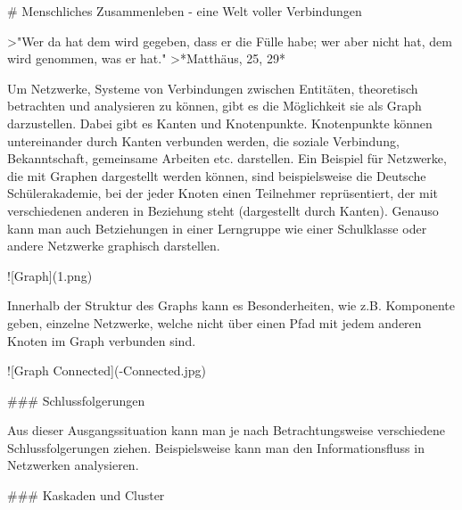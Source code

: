# Menschliches Zusammenleben - eine Welt voller Verbindungen

>"Wer da hat dem wird gegeben, dass er die Fülle habe; wer aber nicht hat, dem wird genommen, was er hat."
>*Matthäus, 25, 29*

Um Netzwerke, Systeme von Verbindungen zwischen Entitäten, theoretisch betrachten und analysieren zu können, gibt es die Möglichkeit sie als Graph darzustellen.
Dabei gibt es Kanten und Knotenpunkte.
Knotenpunkte können untereinander durch Kanten verbunden werden, die soziale Verbindung, Bekanntschaft, gemeinsame Arbeiten etc. darstellen.
Ein Beispiel für Netzwerke, die mit Graphen dargestellt werden können, sind beispielsweise die Deutsche Schülerakademie, bei der jeder Knoten einen Teilnehmer reprüsentiert, der mit verschiedenen anderen in Beziehung steht (dargestellt durch Kanten). Genauso kann man auch Betziehungen in einer Lerngruppe wie einer Schulklasse oder andere Netzwerke graphisch darstellen.

![Graph](\img\graph1.png)

Innerhalb der Struktur des Graphs kann es Besonderheiten, wie z.B. Komponente geben, einzelne Netzwerke, welche nicht über einen Pfad mit jedem anderen Knoten im Graph verbunden sind.

![Graph Connected](\img\Graph-Connected.jpg)

### Schlussfolgerungen

Aus dieser Ausgangssituation kann man je nach Betrachtungsweise verschiedene Schlussfolgerungen ziehen.
Beispielsweise kann man den Informationsfluss in Netzwerken analysieren.

### Kaskaden und Cluster

